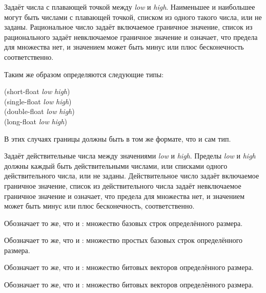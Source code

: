 \begin{flushdesc}
\item[\cd{(float \emph{low} \emph{high})}]
  Задаёт числа с плавающей точкой  между \emph{low} и
  \emph{high}. Наименьшее и наибольшее могут быть числами с плавающей точкой, списком
  из одного такого числа, или не заданы.
  Рациональное число задаёт включаемое граничное значение, список из
  рационального задаёт невключаемое граничное значение и \cdf{*} означает, что
  предела для множества нет, и значением может быть минус или плюс бесконечность
  соответственно.

  Таким же образом определяются следующие типы:
  \begin{lisp}
    (short-float \emph{low} \emph{high}) \\
    (single-float \emph{low} \emph{high}) \\
    (double-float \emph{low} \emph{high}) \\
    (long-float \emph{low} \emph{high})
  \end{lisp}
  В этих случаях границы должны быть в том же формате, что и сам тип.
\end{flushdesc}

\begin{flushdesc}
\item[\cd{(real \emph{low} \emph{high})}]
  Задаёт действительные числа между значениями \emph{low} и \emph{high}. Пределы
  \emph{low} и \emph{high} должны каждый быть действительными числами, или
  списками одного действительного числа, или не заданы.
  Действительное число задаёт включаемое граничное значение, список из
  действительного числа задаёт невключаемое граничное значение и \cdf{*} означает,
  что предела для множества нет, и значением может быть минус или плюс
  бесконечность, соответственно.
\end{flushdesc}

\begin{flushdesc}
\item[\cd{(base-string \emph{size})}]
  Обозначает то же, что и : множество
  базовых строк определённого размера.

\item[\cd{(simple-base-string \emph{size})}]
  Обозначает то же, что и : множество
  простых базовых строк определённого размера.
\end{flushdesc}


\begin{flushdesc}
\item[\cd{(bit-vector \emph{size})}]
  Обозначает то же, что и : множество битовых
  векторов определённого размера.

\item[\cd{(simple-bit-vector \emph{size})}]
  Обозначает то же, что и : множество битовых
  векторов определённого размера.
\end{flushdesc}

